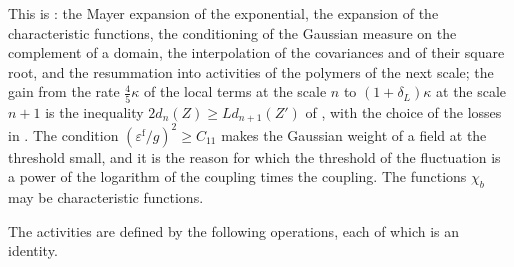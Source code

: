 \documentclass[11pt]{preprint}
\numberwithin{equation}{section}
\begin{document}
This is \cite[(2.1)--(2.13) and Lemma~3, p.~20]{BalabanRG2}: the Mayer expansion of the exponential, the expansion of the characteristic functions, the conditioning of the Gaussian measure on the complement of a domain, the interpolation of the covariances and of their square root, and the resummation into activities of the polymers of the next scale; the gain from the rate $\frac{4}{5}\kappa$ of the local terms at the scale $n$ to $(1 + \delta_L)\kappa$ at the scale $n + 1$ is the inequality $2d_n(Z) \geqslant Ld_{n+1}(Z')$ of \cite[(2.36)]{BalabanRG2}, with the choice of the losses in \cite[p.~21]{BalabanRG2}. The condition $(\varepsilon^{\mathrm f}/g)^2 \geqslant C_{11}$ makes the Gaussian weight of a field at the threshold small, and it is the reason for which the threshold of the fluctuation is a power of the logarithm of the coupling times the coupling. The functions $\chi_b$ may be characteristic functions.

The activities are defined by the following operations, each of which is an identity.
\end{document}
